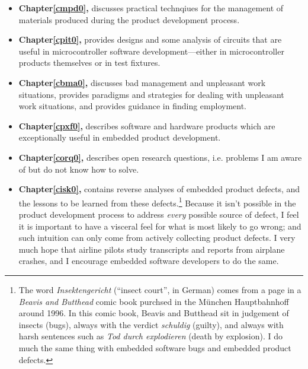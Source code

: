 \begin{itemize}
\item \textbf{Chapter\;\ref{cmpd0}, \cmpdzerotitle{}} discusses practical technqiues for
      the management of materials produced during the product development process.

\item \textbf{Chapter\;\ref{cpit0}, \cpitzerotitle{}} provides designs and some
      analysis of circuits that are useful in microcontroller software 
	  development---either in microcontroller products themselves or in
	  test fixtures.

\item \textbf{Chapter\;\ref{cbma0}, \cbmazerotitle{}} discusses
      bad management and unpleasant work situations, provides paradigms
      and strategies for dealing with unpleasant work situations, and provides
	  guidance in finding employment.

\item \textbf{Chapter\;\ref{cpxf0}, \cpxfzerotitle{}} describes software and
      hardware products which are exceptionally useful in embedded product development.

\item \textbf{Chapter\;\ref{corq0}, \corqzerotitle{}} describes open research
      questions, i.e. problems I am aware of but do not know how to solve.

\item \textbf{Chapter\;\ref{cisk0}, \ciskzerotitle{}} contains reverse analyses of 
      embedded product defects, and the lessons to be learned from these 
	  defects.\footnote{The word \emph{Insektengericht} (``insect court'', in German)
	  comes from a page in a \emph{Beavis and Butthead} comic book purchsed in 
	  the M\"unchen Hauptbahnhoff around 1996.  In this comic book, Beavis and 
	  Butthead sit in judgement of insects (bugs), always with the verdict 
	  \emph{schuldig} (guilty), and always with harsh sentences such as 
	  \emph{Tod durch explodieren} (death by explosion).  I do much the same 
	  thing with embedded software bugs and embedded product defects.}
	  Because it isn't possible in the product development process to address
	  \emph{every} possible source of defect, I feel it is important to
	  have a visceral feel for what is most likely to go wrong; and such
	  intuition can only come from actively collecting product defects.  I very much
	  hope that airline pilots study transcripts and reports from airplane crashes, and I
	  encourage embedded software developers to do the same.
\end{itemize}



